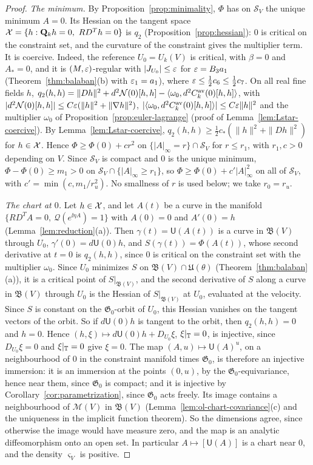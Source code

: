 \begin{proof}
\emph{The minimum.} By Proposition~\ref{prop:minimality}, $\Phi$ has on $\mathcal S_V$ the unique minimum $A=0$. Its Hessian on the tangent space $\mathcal X=\{h:\mathbf Q_kh=0,\ RD^Th=0\}$ is $q_2$ (Proposition~\ref{prop:hessian}): $0$ is critical on the constraint set, and the curvature of the constraint gives the multiplier term. It is coercive. Indeed, the reference $U_0=U_k(V)$ is critical, with $\beta=0$ and $A_*=0$, and it is $(M,\varepsilon)$-regular with $|J_{U_0}|\le\varepsilon$ for $\varepsilon=B_3a_1$ (Theorem~\ref{thm:balaban}(b) with $\varepsilon_1=a_1$), where $\varepsilon\le\frac12c_6\le\frac12c_7$. On all real fine fields $h$, $q_2(h,h)=\|Dh\|^2+d^2\mathcal N(0)[h,h]-\langle \omega_0,d^2C^{\rm av}_k(0)[h,h]\rangle$, with $|d^2\mathcal N(0)[h,h]|\le C\varepsilon(\|h\|^2+\|\nabla h\|^2)$, $|\langle \omega_0,d^2C^{\rm av}_k(0)[h,h]\rangle|\le C\varepsilon\|h\|^2$ and the multiplier $\omega_0$ of Proposition~\ref{prop:euler-lagrange} (proof of Lemma~\ref{lem:Lstar-coercive}). By Lemma~\ref{lem:Lstar-coercive}, $q_2(h,h)\ge\frac12c_*(\|h\|^2+\|Dh\|^2)$ for $h\in\mathcal X$. Hence $\Phi\ge\Phi(0)+cr^2$ on $\{|A|_\infty=r\}\cap\mathcal S_V$ for $r\le r_1$, with $r_1,c>0$ depending on $V$. Since $\mathcal S_V$ is compact and $0$ is the unique minimum, $\Phi-\Phi(0)\ge m_1>0$ on $\mathcal S_V\cap\{|A|_\infty\ge r_1\}$, so $\Phi\ge\Phi(0)+c'|A|_\infty^2$ on all of $\mathcal S_V$, with $c'=\min(c,m_1/r_u^2)$. No smallness of $r$ is used below; we take $r_0=r_u$.

\emph{The chart at $0$.} Let $h\in\mathcal X$, and let $A(t)$ be a curve in the manifold $\{RD^TA=0,\ \mathcal Q(e^{\ii\eta A})=1\}$ with $A(0)=0$ and $A'(0)=h$ (Lemma~\ref{lem:reduction}(a)). Then $\gamma(t)=\mathsf U(A(t))$ is a curve in $\mathfrak B(V)$ through $U_0$, $\gamma'(0)=d\mathsf U(0)h$, and $S(\gamma(t))=\Phi(A(t))$, whose second derivative at $t=0$ is $q_2(h,h)$, since $0$ is critical on the constraint set with the multiplier $\omega_0$. Since $U_0$ minimizes $S$ on $\mathfrak B(V)\cap\mathfrak U(\theta)$ (Theorem~\ref{thm:balaban}(a)), it is a critical point of $S|_{\mathfrak B(V)}$, and the second derivative of $S$ along a curve in $\mathfrak B(V)$ through $U_0$ is the Hessian of $S|_{\mathfrak B(V)}$ at $U_0$, evaluated at the velocity. Since $S$ is constant on the $\mathfrak G_0$-orbit of $U_0$, this Hessian vanishes on the tangent vectors of the orbit. So if $d\mathsf U(0)h$ is tangent to the orbit, then $q_2(h,h)=0$ and $h=0$. Hence $(h,\xi)\mapsto d\mathsf U(0)h+D_{U_0}\xi$, $\xi|_\mathbb T=0$, is injective, since $D_{U_0}\xi=0$ and $\xi|_\mathbb T=0$ give $\xi=0$. The map $(A,u)\mapsto\mathsf U(A)^u$, on a neighbourhood of $0$ in the constraint manifold times $\mathfrak G_0$, is therefore an injective immersion: it is an immersion at the points $(0,u)$, by the $\mathfrak G_0$-equivariance, hence near them, since $\mathfrak G_0$ is compact; and it is injective by Corollary~\ref{cor:parametrization}, since $\mathfrak G_0$ acts freely. Its image contains a neighbourhood of $\mathscr M(V)$ in $\mathfrak B(V)$ (Lemma~\ref{lem:ol-chart-covariance}(c) and the uniqueness in the implicit function theorem). So the dimensions agree, since otherwise the image would have measure zero, and the map is an analytic diffeomorphism onto an open set. In particular $A\mapsto[\mathsf U(A)]$ is a chart near $0$, and the density $\varsigma_V$ is positive.


\end{proof}
